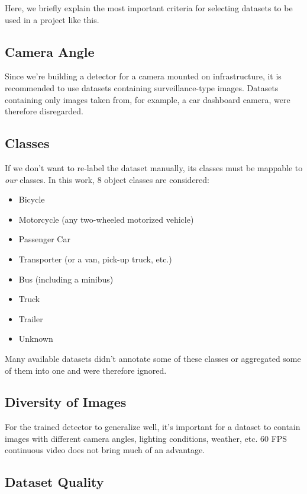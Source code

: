 Here, we briefly explain the most important criteria for selecting datasets to
be used in a project like this.

\subsection*{Camera Angle}

Since we're building a detector for a camera mounted on infrastructure, it is
recommended to use datasets containing surveillance-type images. Datasets
containing only images taken from, for example, a car dashboard camera, were
therefore disregarded.

\subsection*{Classes}

If we don't want to re-label the dataset manually, its classes must be mappable
to \textit{our} classes. In this work, 8 object classes are considered:
\begin{itemize}
    \item Bicycle
    \item Motorcycle (any two-wheeled motorized vehicle)
    \item Passenger Car
    \item Transporter (or a van, pick-up truck, etc.)
    \item Bus (including a minibus)
    \item Truck
    \item Trailer
    \item Unknown
\end{itemize}

Many available datasets didn't annotate some of these classes or aggregated some of them into one
and were therefore ignored.

\subsection*{Diversity of Images}

For the trained detector to generalize well, it's important for a dataset to
contain images with different camera angles, lighting conditions, weather, etc.
60 FPS continuous video does not bring much of an advantage.

\subsection*{Dataset Quality}

